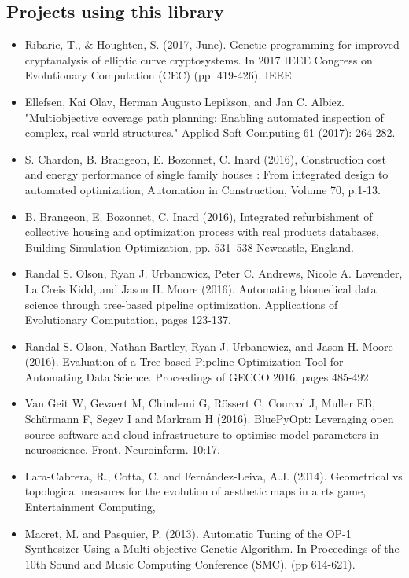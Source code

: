 \documentclass{article}
\begin{document}
\subsection{Projects using this library}
\begin{itemize}
    \item 
    Ribaric, T., \& Houghten, S. (2017, June). Genetic programming for improved cryptanalysis of elliptic curve cryptosystems. In 2017 IEEE Congress on Evolutionary Computation (CEC) (pp. 419-426). IEEE.
   \item Ellefsen, Kai Olav, Herman Augusto Lepikson, and Jan C. Albiez. "Multiobjective coverage path planning: Enabling automated inspection of complex, real-world structures." Applied Soft Computing 61 (2017): 264-282.
    \item S. Chardon, B. Brangeon, E. Bozonnet, C. Inard (2016), Construction cost and energy performance of single family houses : From integrated design to automated optimization, Automation in Construction, Volume 70, p.1-13.
    \item B. Brangeon, E. Bozonnet, C. Inard (2016), Integrated refurbishment of collective housing and optimization process with real products databases, Building Simulation Optimization, pp. 531–538 Newcastle, England.
    \item Randal S. Olson, Ryan J. Urbanowicz, Peter C. Andrews, Nicole A. Lavender, La Creis Kidd, and Jason H. Moore (2016). Automating biomedical data science through tree-based pipeline optimization. Applications of Evolutionary Computation, pages 123-137.
    \item Randal S. Olson, Nathan Bartley, Ryan J. Urbanowicz, and Jason H. Moore (2016). Evaluation of a Tree-based Pipeline Optimization Tool for Automating Data Science. Proceedings of GECCO 2016, pages 485-492.
    \item Van Geit W, Gevaert M, Chindemi G, Rössert C, Courcol J, Muller EB, Schürmann F, Segev I and Markram H (2016). BluePyOpt: Leveraging open source software and cloud infrastructure to optimise model parameters in neuroscience. Front. Neuroinform. 10:17. 
   \item  Lara-Cabrera, R., Cotta, C. and Fernández-Leiva, A.J. (2014). Geometrical vs topological measures for the evolution of aesthetic maps in a rts game, Entertainment Computing,
    \item Macret, M. and Pasquier, P. (2013). Automatic Tuning of the OP-1 Synthesizer Using a Multi-objective Genetic Algorithm. In Proceedings of the 10th Sound and Music Computing Conference (SMC). (pp 614-621).

\end{itemize}
\end{document}
